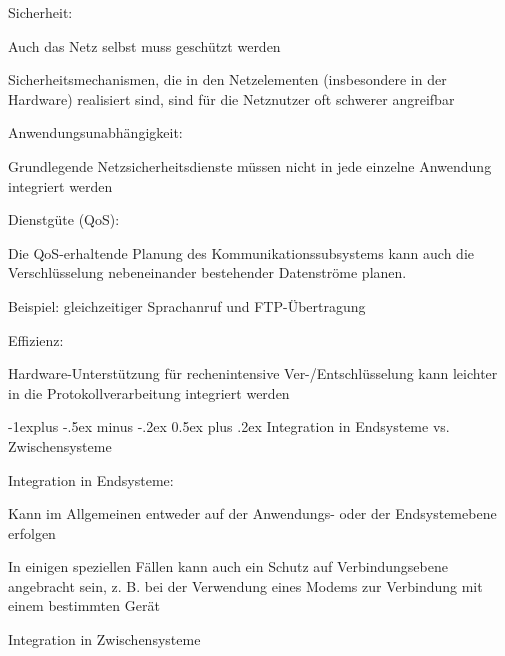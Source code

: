 \documentclass[a4paper]{article}
\makeatletter
\renewcommand{\subsection}{\@startsection{subsection}{2}{0mm}%
 {-1explus -.5ex minus -.2ex}%
 {0.5ex plus .2ex}%
 {\normalfont\normalsize\bfseries}}
\makeatother
\begin{document}
\begin{multicols}{3}
\begin{itemize*}
            \begin{itemize*}
                  \item Sicherheit:
                  \begin{itemize*} \item Auch das Netz selbst muss geschützt werden \item Sicherheitsmechanismen, die in den Netzelementen (insbesondere in der Hardware) realisiert sind, sind für die Netznutzer oft schwerer angreifbar \end{itemize*}
                  \item Anwendungsunabhängigkeit:
                  \begin{itemize*} \item Grundlegende Netzsicherheitsdienste müssen nicht in jede einzelne Anwendung integriert werden \end{itemize*}
                  \item Dienstgüte (QoS):
                  \begin{itemize*} \item Die QoS-erhaltende Planung des Kommunikationssubsystems kann auch die Verschlüsselung nebeneinander bestehender Datenströme planen. \item Beispiel: gleichzeitiger Sprachanruf und FTP-Übertragung \end{itemize*}
                  \item Effizienz:
                  \begin{itemize*} \item Hardware-Unterstützung für rechenintensive Ver-/Entschlüsselung kann leichter in die Protokollverarbeitung integriert werden \end{itemize*}
            \end{itemize*}
      \end{itemize*}


      \subsection{Integration in Endsysteme vs.
            Zwischensysteme}

      \begin{itemize*}
            \item
            Integration in Endsysteme:

            \begin{itemize*}
                  \item Kann im Allgemeinen entweder auf der Anwendungs- oder der Endsystemebene erfolgen
                  \item In einigen speziellen Fällen kann auch ein Schutz auf Verbindungsebene angebracht sein, z. B. bei der Verwendung eines Modems zur Verbindung mit einem bestimmten Gerät
            \end{itemize*}
            \item
            Integration in Zwischensysteme


\end{itemize*}
\end{multicols}
\end{document}
